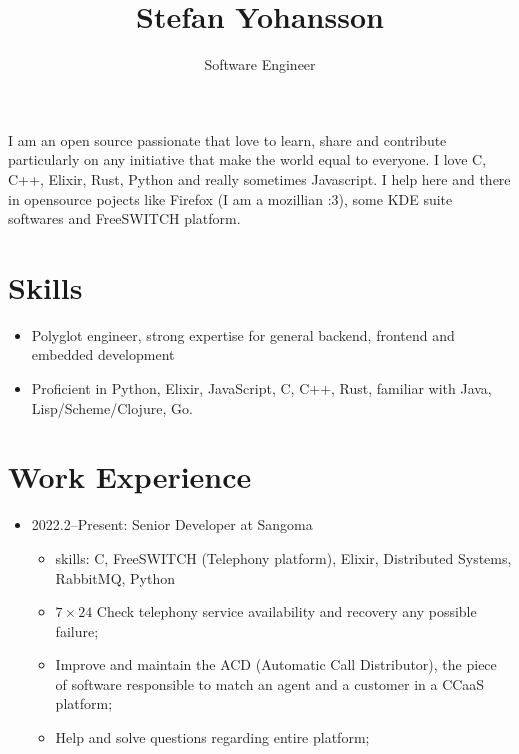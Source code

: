 \documentclass[
]{article}
\title{Stefan Yohansson}
\subtitle{Software Engineer}
\author{}
\date{}
\providecommand{\tightlist}{%
  \setlength{\itemsep}{0pt}\setlength{\parskip}{0pt}}
\begin{document}
\maketitle

I am an open source passionate that love to learn, share and contribute
particularly on any initiative that make the world equal to everyone. I
love C, C++, Elixir, Rust, Python and really sometimes Javascript. I
help here and there in opensource pojects like Firefox (I am a mozillian
:3), some KDE suite softwares and FreeSWITCH platform.

\hypertarget{skills}{%
\section{Skills}\label{skills}}

\begin{itemize}
\tightlist
\item
  Polyglot engineer, strong expertise for general backend, frontend and
  embedded development
\item
  Proficient in Python, Elixir, JavaScript, C, C++, Rust, familiar with
  Java, Lisp/Scheme/Clojure, Go.
\end{itemize}

\hypertarget{work-experience}{%
\section{Work Experience}\label{work-experience}}

\begin{itemize}
\tightlist
\item
  2022.2--Present: Senior Developer at Sangoma

  \begin{itemize}
  \tightlist
  \item
    skills: C, FreeSWITCH (Telephony platform), Elixir, Distributed
    Systems, RabbitMQ, Python
  \item
    \(7 \times 24\) Check telephony service availability and recovery
    any possible failure;
  \item
    Improve and maintain the ACD (Automatic Call Distributor), the piece
    of software responsible to match an agent and a customer in a CCaaS
    platform;
  \item
    Help and solve questions regarding entire platform;
  \end{itemize}
\end{itemize}
\end{document}
